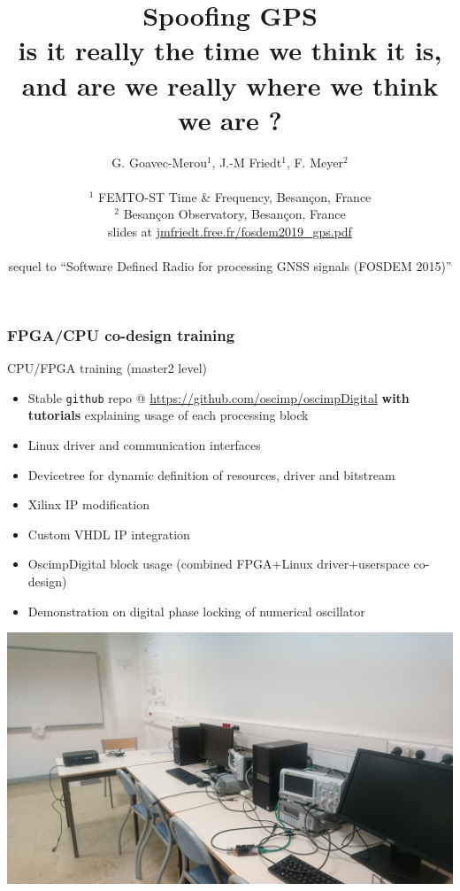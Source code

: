 \documentclass[compress,10pt]{beamer}
\title[FPGA]{Spoofing GPS \\
{
is it really the time we think it is, and are we really where we think we 
are ?}
 \vspace{0.2cm}}
\author[]{G. Goavec-Merou$^1$, J.-M Friedt$^1$, F. Meyer$^2$\\ \ \\
$^1$ FEMTO-ST Time \& Frequency, Besan\c con, France\\
$^2$ Besan\c con Observatory, Besan\c con, France\\
\vspace{0.3cm}
slides at \url{jmfriedt.free.fr/fosdem2019_gps.pdf}\\\ \\
sequel to ``Software Defined Radio for processing GNSS signals (FOSDEM 2015)''
}
\begin{document}
\begin{frame}\frametitle{FPGA/CPU co-design training}

CPU/FPGA training (master2 level)

\begin{itemize}
\item Stable {\tt github} repo @ \url{https://github.com/oscimp/oscimpDigital} {\bf with tutorials} explaining
usage of each processing block
\item Linux driver and communication interfaces
\item Devicetree for dynamic definition of resources, driver and bitstream
\item Xilinx IP modification
\item Custom VHDL IP integration
\item OscimpDigital block usage (combined FPGA+Linux driver+userspace co-design)
\item Demonstration on digital phase locking of numerical oscillator
\end{itemize}

\includegraphics[width=.5\linewidth]{DSC_0050.JPG}
\end{frame}
\end{document}
